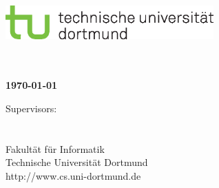 \thispagestyle{empty}
\begin{titlepage}
\vspace*{-2cm}
\newlength{\links}
\setlength{\links}{-0.5cm} \sf \LARGE



\hspace*{\links}
\begin{minipage}{12.5cm}
\includegraphics[width=8cm]{coverpage/tud_logo_cmyk}
\end{minipage}

\vspace*{4cm}

\hspace*{\links}
\hspace*{-0.2cm}
\begin{minipage}{9cm}
\large
\begin{center}
\bf{\Titel} \\
\vspace*{1.5cm}
\Autor\\
\today
\end{center}
\end{minipage}



\vfill

\hspace*{\links}
\begin{minipage}[b]{15cm}
\normalsize
\raggedright
%
\vspace*{2.5cm}
%
\normalsize \raggedright
Supervisors: \\
\Supervisor \\
\otherSupervisor \\
\vspace*{1.5cm}
\textcolor{TUGreen}{Fakultät für Informatik\\
Technische Universität Dortmund \\
http://www.cs.uni-dortmund.de}
\end{minipage}


\end{titlepage}

